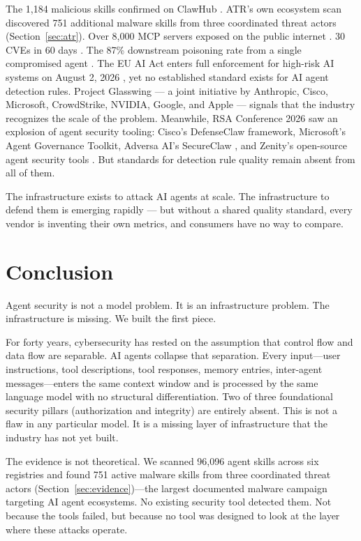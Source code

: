 \documentclass[11pt,letterpaper]{article}
\begin{document}
The 1,184 malicious skills confirmed on ClawHub \cite{antiy}. ATR's own ecosystem scan discovered 751 additional malware skills from three coordinated threat actors (Section~\ref{sec:atr}). Over 8,000 MCP servers exposed on the public internet \cite{checkmarx,paloalto}. 30 CVEs in 60 days \cite{checkmarx,cosai}. The 87\% downstream poisoning rate from a single compromised agent \cite{galileo}. The EU AI Act enters full enforcement for high-risk AI systems on August 2, 2026 \cite{euaiact}, yet no established standard exists for AI agent detection rules. Project Glasswing \cite{glasswing} --- a joint initiative by Anthropic, Cisco, Microsoft, CrowdStrike, NVIDIA, Google, and Apple --- signals that the industry recognizes the scale of the problem. Meanwhile, RSA Conference 2026 saw an explosion of agent security tooling: Cisco's DefenseClaw framework, Microsoft's Agent Governance Toolkit, Adversa AI's SecureClaw \cite{secureclaw}, and Zenity's open-source agent security tools \cite{zenity}. But standards for detection rule quality remain absent from all of them.

The infrastructure exists to attack AI agents at scale. The infrastructure to defend them is emerging rapidly --- but without a shared quality standard, every vendor is inventing their own metrics, and consumers have no way to compare.


\section{Conclusion}
\label{sec:conclusion}

Agent security is not a model problem. It is an infrastructure problem. The infrastructure is missing. We built the first piece.

For forty years, cybersecurity has rested on the assumption that control flow and data flow are separable. AI agents collapse that separation. Every input---user instructions, tool descriptions, tool responses, memory entries, inter-agent messages---enters the same context window and is processed by the same language model with no structural differentiation. Two of three foundational security pillars (authorization and integrity) are entirely absent. This is not a flaw in any particular model. It is a missing layer of infrastructure that the industry has not yet built.

The evidence is not theoretical. We scanned 96,096 agent skills across six registries and found 751 active malware skills from three coordinated threat actors (Section~\ref{sec:evidence})---the largest documented malware campaign targeting AI agent ecosystems. No existing security tool detected them. Not because the tools failed, but because no tool was designed to look at the layer where these attacks operate.
\end{document}
